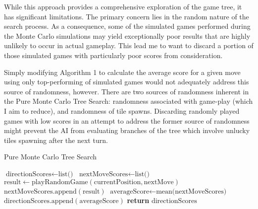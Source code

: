 \documentclass{article}
\begin{document}
While this approach provides a comprehensive exploration of the game tree, it has significant limitations. The primary concern lies in the random nature of the search process. As a consequence, some of the simulated games performed during the Monte Carlo simulations may yield exceptionally poor results that are highly unlikely to occur in actual gameplay.  This lead me to want to discard a portion of those simulated games with particularly poor scores from consideration.

Simply modifying Algorithm 1 to calculate the average score for a given move using only top-performing of simulated games would not adequately address this source of randomness, however.  There are two sources of randomness inherent in the Pure Monte Carlo Tree Search: randomness associated with game-play (which I aim to reduce), and randomness of tile spawns.  Discarding randomly played games with low scores in an attempt to address the former source of randomness might prevent the AI from evaluating branches of the tree which involve unlucky tiles spawning after the next turn.

\begin{algorithm}
\label{PMCTS_algo}
    \caption{Pure Monte Carlo Tree Search}
    \begin{algorithmic}[1]
            \State $\text{directionScores} \gets \text{list()}$
                \State $\text{nextMoveScores} \gets \text{list()}$
                    \State $\text{result} \gets \text{playRandomGame}(\text{currentPosition}, \text{nextMove})$
                    \State $\text{nextMoveScores}.\text{append}(\text{result})$
                \EndFor
                \State $\text{averageScore} \gets \text{mean(nextMoveScores)}$
                \State $\text{directionScores}.\text{append}(\text{averageScore})$
            \EndFor
            \State \textbf{return} $\text{directionScores}$
        \EndFunction
    \end{algorithmic}
\end{algorithm}
\end{document}
